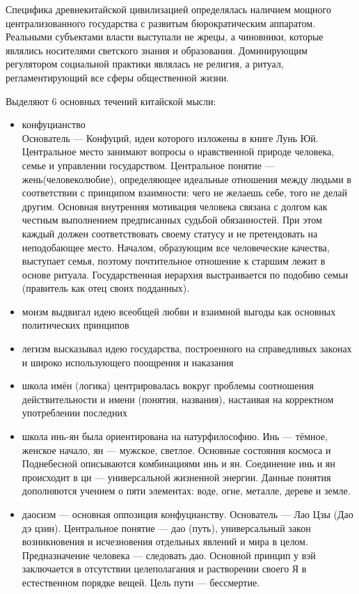 Специфика древнекитайской цивилизацией определялась наличием мощного централизованного государства с развитым бюрократическим аппаратом. Реальными субъектами власти выступали не жрецы, а чиновники, которые являлись носителями светского знания и образования. Доминирующим регулятором социальной практики являлась не религия, а ритуал, регламентирующий все сферы общественной жизни.

Выделяют 6 основных течений китайской мысли:
\begin{itemize}
    \item конфуцианство\\
    Основатель --- Конфуций, идеи которого изложены в книге Лунь Юй. Центральное место занимают вопросы о нравственной природе человека, семье и управлении государством. Центральное понятие --- жень(человеколюбие), определяющее идеальные отношения между людьми в соответствии с принципом взаимности: чего не желаешь себе, того не делай другим. Основная внутренняя мотивация человека связана с долгом как честным выполнением предписанных судьбой обязанностей. При этом каждый должен соответствовать своему статусу и не претендовать на неподобающее место. Началом, образующим все человеческие качества, выступает семья, поэтому почтительное отношение к старшим лежит в основе ритуала. Государственная иерархия выстраивается по подобию семьи (правитель как отец своих подданных).
    \item моизм выдвигал идею всеобщей любви и взаимной выгоды как основных политических принципов
    \item легизм высказывал идею государства, построенного на справедливых законах и широко использующего поощрения и наказания
    \item школа имён (логика) центрировалась вокруг проблемы соотношения действительности и имени (понятия, названия), настаивая на корректном употреблении последних
    \item школа инь-ян была ориентирована на натурфилософию. Инь --- тёмное, женское начало, ян --- мужское, светлое. Основные состояния космоса и Поднебесной описываются комбинациями инь и ян. Соединение инь и ян происходит в ци --- универсальной жизненной энергии. Данные понятия дополняются учением о пяти элементах: воде, огне, металле, дереве и земле.
    \item даосизм --- основная оппозиция конфуцианству. Основатель --- Лао Цзы (Дао дэ цзин). Центральное понятие --- дао (путь), универсальный закон возникновения и исчезновения отдельных явлений и мира в целом. Предназначение человека --- следовать дао. Основной принцип у вэй заключается в отсутствии целеполагания и растворении своего Я в естественном порядке вещей. Цель пути --- бессмертие.
\end{itemize}

